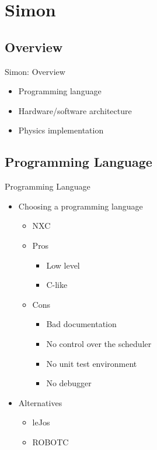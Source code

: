 \section{Simon}
\subsection{Overview}
\begin{frame}{Simon: Overview}
	\begin{itemize}
	  \item Programming language
	  \item Hardware/software architecture
	  \item Physics implementation
	\end{itemize}
\end{frame}

\subsection{Programming Language}
\begin{frame}{Programming Language}
	\begin{itemize}
	  \item Choosing a programming language
	  \begin{itemize}
	  	\item NXC
	  	\item Pros
	  	\begin{itemize}
	  	  \item Low level 
	  	  \item C-like
	  	\end{itemize}
	  	\item Cons
	  	\begin{itemize}
	  	  \item Bad documentation
	  	  \item No control over the scheduler
	  	  \item No unit test environment
	  	  \item No debugger
	  	\end{itemize}
	  \end{itemize}
	  \item Alternatives
	  \begin{itemize}
	    \item leJos
	    \item ROBOTC
	  \end{itemize}
	\end{itemize}
\end{frame}

